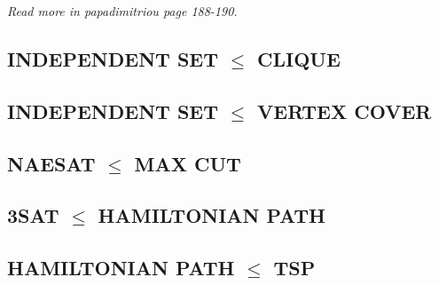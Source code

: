 \documentclass{article}
\begin{document}
\textit{Read more in papadimitriou page 188-190.}
\subsection{INDEPENDENT SET $\le$ CLIQUE}
\subsection{INDEPENDENT SET $\le$ VERTEX COVER}
\subsection{NAESAT $\le$ MAX CUT}
\subsection{3SAT $\le$ HAMILTONIAN PATH}
\subsection{HAMILTONIAN PATH $\le$ TSP}
\end{document}
